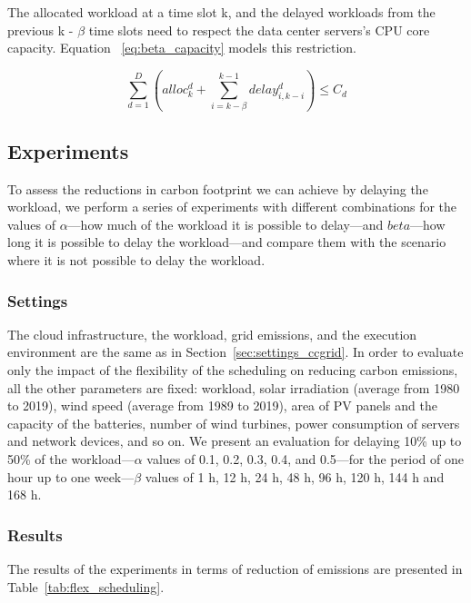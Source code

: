 The allocated workload at a time slot k, and the delayed workloads from the previous k - $\beta$ time slots need to respect the data center servers's CPU core capacity. Equation ~\eqref{eq:beta_capacity} models this restriction.
     
\begin{equation} \label{eq:beta_capacity}
\sum_{d=1}^D    (alloc_k^d  +    \sum_{i=k-\beta}^{k-1} delay_{  i ,  k-i  }^d)  \leq C_d 
\end{equation}

\subsection{Experiments}

To assess the reductions in carbon footprint we can achieve by delaying the workload, we perform a series of experiments with different combinations for the values of $\alpha$---how much of the workload it is possible to delay---and $beta$---how long it is possible to delay the workload---and compare them with the scenario where it is not possible to delay the workload.

\subsubsection{Settings}

The cloud infrastructure, the workload, grid emissions, and the execution environment are the same as in Section~\ref{sec:settings_ccgrid}. In order to evaluate only the impact of the flexibility of the scheduling on reducing carbon emissions, all the other parameters are fixed: workload, solar irradiation (average from 1980 to 2019), wind speed (average from 1989 to 2019), area of PV panels and the capacity of the batteries, number of wind turbines, power consumption of servers and network devices, and so on. We present an evaluation for delaying 10\% up to 50\% of the workload---$\alpha$ values of 0.1, 0.2, 0.3, 0.4, and 0.5---for the period of one hour up to one week---$\beta$ values of 1 h, 12 h, 24 h, 48 h, 96 h, 120 h, 144 h and 168 h.
\subsubsection{Results}

The results of the experiments in terms of reduction of  emissions are presented in Table~\ref{tab:flex_scheduling}.



